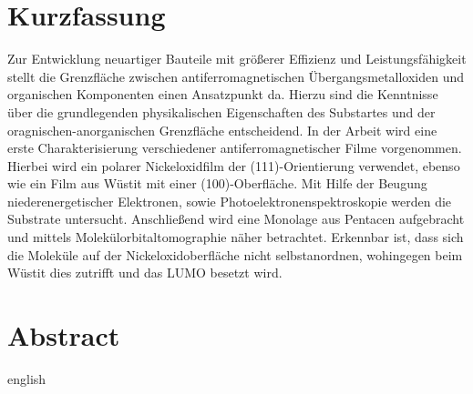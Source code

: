 \thispagestyle{plain}

\section*{Kurzfassung}
Zur Entwicklung neuartiger Bauteile mit größerer Effizienz und Leistungsfähigkeit stellt die Grenzfläche zwischen antiferromagnetischen Übergangsmetalloxiden und organischen Komponenten einen Ansatzpunkt da.
Hierzu sind die Kenntnisse über die grundlegenden physikalischen Eigenschaften des Substartes und der oragnischen-anorganischen Grenzfläche entscheidend.
In der Arbeit wird eine erste Charakterisierung verschiedener antiferromagnetischer Filme vorgenommen.
Hierbei wird ein polarer Nickeloxidfilm der (111)-Orientierung verwendet, ebenso wie ein Film aus Wüstit mit einer (100)-Oberfläche.
Mit Hilfe der Beugung niederenergetischer Elektronen, sowie Photoelektronenspektroskopie werden die Substrate untersucht.
Anschließend wird eine Monolage aus Pentacen aufgebracht und mittels Molekülorbitaltomographie näher betrachtet.
Erkennbar ist, dass sich die Moleküle auf der Nickeloxidoberfläche nicht selbstanordnen, wohingegen beim Wüstit dies zutrifft und das LUMO besetzt wird.

\section*{Abstract}
\begin{foreignlanguage}{english}

\end{foreignlanguage}
